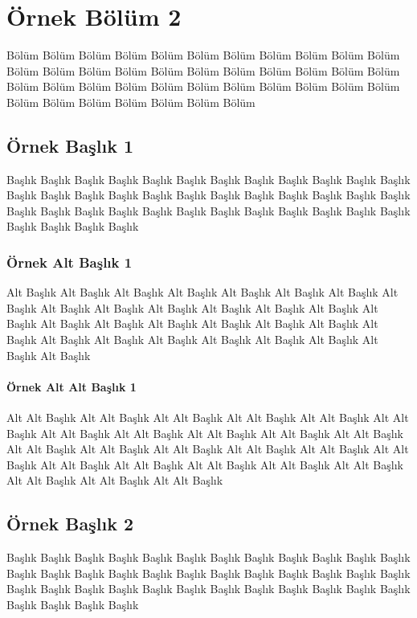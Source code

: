 \chapter{Örnek Bölüm 2}

Bölüm Bölüm Bölüm Bölüm Bölüm Bölüm Bölüm Bölüm
Bölüm Bölüm Bölüm Bölüm Bölüm Bölüm Bölüm Bölüm
Bölüm Bölüm Bölüm Bölüm Bölüm Bölüm Bölüm Bölüm
Bölüm Bölüm Bölüm Bölüm Bölüm Bölüm Bölüm Bölüm
Bölüm Bölüm Bölüm Bölüm Bölüm Bölüm Bölüm Bölüm

\section{Örnek Başlık 1}

Başlık Başlık Başlık Başlık Başlık Başlık Başlık Başlık
Başlık Başlık Başlık Başlık Başlık Başlık Başlık Başlık
Başlık Başlık Başlık Başlık Başlık Başlık Başlık Başlık
Başlık Başlık Başlık Başlık Başlık Başlık Başlık Başlık
Başlık Başlık Başlık Başlık Başlık Başlık Başlık Başlık

\subsection{Örnek Alt Başlık 1}

Alt Başlık Alt Başlık Alt Başlık Alt Başlık Alt Başlık Alt Başlık
Alt Başlık Alt Başlık Alt Başlık Alt Başlık Alt Başlık Alt Başlık
Alt Başlık Alt Başlık Alt Başlık Alt Başlık Alt Başlık Alt Başlık
Alt Başlık Alt Başlık Alt Başlık Alt Başlık Alt Başlık Alt Başlık
Alt Başlık Alt Başlık Alt Başlık Alt Başlık Alt Başlık Alt Başlık

\subsubsection{Örnek Alt Alt Başlık 1}

Alt Alt Başlık Alt Alt Başlık Alt Alt Başlık Alt Alt Başlık Alt Alt Başlık
Alt Alt Başlık Alt Alt Başlık Alt Alt Başlık Alt Alt Başlık Alt Alt Başlık
Alt Alt Başlık Alt Alt Başlık Alt Alt Başlık Alt Alt Başlık Alt Alt Başlık
Alt Alt Başlık Alt Alt Başlık Alt Alt Başlık Alt Alt Başlık Alt Alt Başlık
Alt Alt Başlık Alt Alt Başlık Alt Alt Başlık Alt Alt Başlık Alt Alt Başlık

\section{Örnek Başlık 2}

Başlık Başlık Başlık Başlık Başlık Başlık Başlık Başlık
Başlık Başlık Başlık Başlık Başlık Başlık Başlık Başlık
Başlık Başlık Başlık Başlık Başlık Başlık Başlık Başlık
Başlık Başlık Başlık Başlık Başlık Başlık Başlık Başlık
Başlık Başlık Başlık Başlık Başlık Başlık Başlık Başlık
